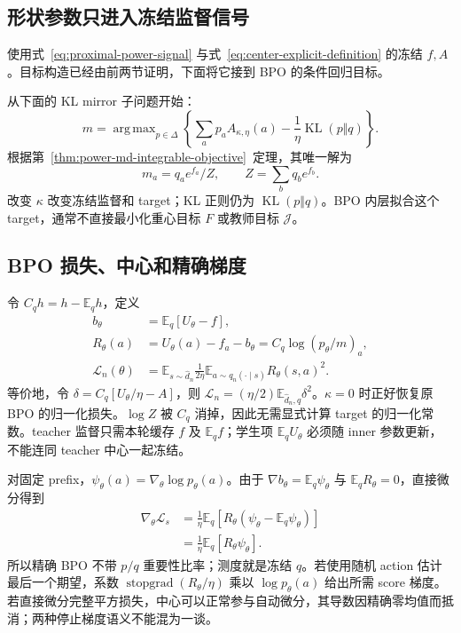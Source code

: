 \documentclass[lang=cn,scheme=chinese,openany]{../book/elegantbook}
\newcommand{\E}{\mathbb E}
\newcommand{\KL}{\operatorname{KL}}
\newcommand{\sg}{\operatorname{stopgrad}}
\DeclareMathOperator*{\argmax}{arg\,max}
\begin{document}
\subsection{形状参数只进入冻结监督信号}

使用式~\eqref{eq:proximal-power-signal} 与式~\eqref{eq:center-explicit-definition} 的冻结 $f,A$。目标构造已经由前两节证明，下面将它接到 BPO 的条件回归目标。

从下面的 KL mirror 子问题开始：
\begin{equation}
 m=\argmax_{p\in\Delta}
 \left\{\sum_a p_a A_{\kappa,\eta}(a)
       -\frac1\eta\KL(p\Vert q)\right\}.
 \label{eq:power-bpo-mirror-subproblem}
\end{equation}
根据第~\ref{thm:power-md-integrable-objective}~定理，其唯一解为
\begin{equation}
 m_a=q_ae^{f_a}/Z,\qquad Z=\sum_bq_be^{f_b}.
 \label{eq:power-bpo-explicit-target}
\end{equation}
改变 $\kappa$ 改变冻结监督和 target；KL 正则仍为 $\KL(p\Vert q)$。BPO 内层拟合这个 target，通常不直接最小化重心目标 $F$ 或教师目标 $\mathcal J$。

\subsection{BPO 损失、中心和精确梯度}

令 $C_qh=h-\E_qh$，定义
\begin{align}
 b_\theta&=\E_q[U_\theta-f],\\
 R_\theta(a)&=U_\theta(a)-f_a-b_\theta
            =C_q\log(p_\theta/m)_a,\\
 \mathcal L_n(\theta)
 &=\E_{s\sim\widehat d_n}\frac1{2\eta}
     \E_{a\sim q_n(\cdot\mid s)}R_\theta(s,a)^2.
 \label{eq:power-bpo-population-loss}
\end{align}
等价地，令 $\delta=C_q[U_\theta/\eta-A]$，则 $\mathcal L_n=(\eta/2)\E_{\widehat d_n,q}\delta^2$。$\kappa=0$ 时正好恢复原 BPO 的归一化损失。$\log Z$ 被 $C_q$ 消掉，因此无需显式计算 target 的归一化常数。teacher 监督只需本轮缓存 $f$ 及 $\E_qf$；学生项 $\E_qU_\theta$ 必须随 inner 参数更新，不能连同 teacher 中心一起冻结。

对固定 prefix，$\psi_\theta(a)=\nabla_\theta\log p_\theta(a)$。由于 $\nabla b_\theta=\E_q\psi_\theta$ 与 $\E_qR_\theta=0$，直接微分得到
\begin{align}
 \nabla_\theta\mathcal L_s
 &=\frac1\eta\E_q[R_\theta(\psi_\theta-\E_q\psi_\theta)]\\
 &=\frac1\eta\E_q[R_\theta\psi_\theta].
 \label{eq:power-bpo-gradient}
\end{align}
所以精确 BPO 不带 $p/q$ 重要性比率；测度就是冻结 $q$。若使用随机 action 估计最后一个期望，系数 $\sg(R_\theta/\eta)$ 乘以 $\log p_\theta(a)$ 给出所需 score 梯度。若直接微分完整平方损失，中心可以正常参与自动微分，其导数因精确零均值而抵消；两种停止梯度语义不能混为一谈。
\end{document}
